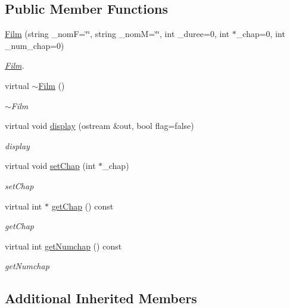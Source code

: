 \subsection*{Public Member Functions}
\begin{DoxyCompactItemize}
\item 
\hyperlink{classFilm_ac27cea51ddd9ba34caa4e3b7c57c1135}{Film} (string \+\_\+nom\+F=\char`\"{}\char`\"{}, string \+\_\+nom\+M=\char`\"{}\char`\"{}, int \+\_\+duree=0, int $\ast$\+\_\+chap=0, int \+\_\+num\+\_\+chap=0)
\begin{DoxyCompactList}\small\item\em \hyperlink{classFilm}{Film}. \end{DoxyCompactList}\item 
virtual \hyperlink{classFilm_a8dab653f8a6c0635ca5ddbe0bbdd9a25}{$\sim$\+Film} ()
\begin{DoxyCompactList}\small\item\em $\sim$\+Film \end{DoxyCompactList}\item 
virtual void \hyperlink{classFilm_a9f6a67ac8aa1e16501676c70e35d4eb4}{display} (ostream \&out, bool flag=false)
\begin{DoxyCompactList}\small\item\em display \end{DoxyCompactList}\item 
virtual void \hyperlink{classFilm_a7be11e6206727ca3890cde5ea53b15aa}{set\+Chap} (int $\ast$\+\_\+chap)
\begin{DoxyCompactList}\small\item\em set\+Chap \end{DoxyCompactList}\item 
virtual int $\ast$ \hyperlink{classFilm_a12afe1eaee7e1df294ba4f1e35e33666}{get\+Chap} () const 
\begin{DoxyCompactList}\small\item\em get\+Chap \end{DoxyCompactList}\item 
virtual int \hyperlink{classFilm_a0966fa9c7b17e2129273f8e10fa4862e}{get\+Numchap} () const 
\begin{DoxyCompactList}\small\item\em get\+Numchap \end{DoxyCompactList}\end{DoxyCompactItemize}
\subsection*{Additional Inherited Members}



